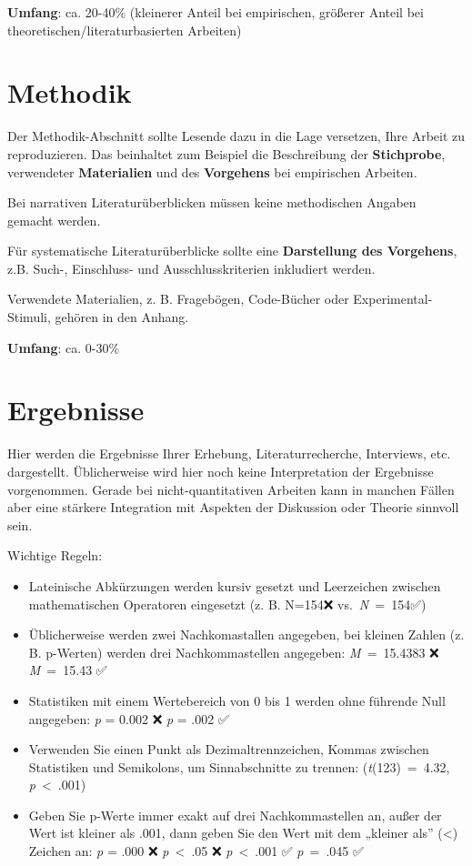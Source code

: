 \documentclass[
  letterpaper,
  DIV=11]{scrreprt}
\begin{document}
\textbf{Umfang}: ca. 20-40\% (kleinerer Anteil bei empirischen, größerer
Anteil bei theoretischen/literaturbasierten Arbeiten)

\section{Methodik}\label{methodik}

Der Methodik-Abschnitt sollte Lesende dazu in die Lage versetzen, Ihre
Arbeit zu reproduzieren. Das beinhaltet zum Beispiel die Beschreibung
der \textbf{Stichprobe}, verwendeter \textbf{Materialien} und des
\textbf{Vorgehens} bei empirischen Arbeiten.

Bei narrativen Literaturüberblicken müssen keine methodischen Angaben
gemacht werden.

Für systematische Literaturüberblicke sollte eine \textbf{Darstellung
des Vorgehens}, z.B. Such-, Einschluss- und Ausschlusskriterien
inkludiert werden.

Verwendete Materialien, z. B. Fragebögen, Code-Bücher oder
Experimental-Stimuli, gehören in den Anhang.

\textbf{Umfang}: ca. 0-30\%

\section{Ergebnisse}\label{ergebnisse}

Hier werden die Ergebnisse Ihrer Erhebung, Literaturrecherche,
Interviews, etc. dargestellt. Üblicherweise wird hier noch keine
Interpretation der Ergebnisse vorgenommen. Gerade bei
nicht-quantitativen Arbeiten kann in manchen Fällen aber eine stärkere
Integration mit Aspekten der Diskussion oder Theorie sinnvoll sein.

Wichtige Regeln:

\begin{itemize}
\item
  Lateinische Abkürzungen werden kursiv gesetzt und Leerzeichen zwischen
  mathematischen Operatoren eingesetzt (z. B. N=154❌
  vs.~\emph{N}~=~154✅)
\item
  Üblicherweise werden zwei Nachkomastallen angegeben, bei kleinen
  Zahlen (z. B. p-Werten) werden drei Nachkommastellen angegeben:
  \emph{M}~=~15.4383 ❌ \emph{M}~=~15.43 ✅
\item
  Statistiken mit einem Wertebereich von 0 bis 1 werden ohne führende
  Null angegeben: \emph{p} = 0.002 ❌ \emph{p} = .002 ✅
\item
  Verwenden Sie einen Punkt als Dezimaltrennzeichen, Kommas zwischen
  Statistiken und Semikolons, um Sinnabschnitte zu trennen:
  (\emph{t}(123)~=~4.32, \emph{p}~\textless~.001)
\item
  Geben Sie p-Werte immer exakt auf drei Nachkommastellen an, außer der
  Wert ist kleiner als .001, dann geben Sie den Wert mit dem „kleiner
  als'' (\textless) Zeichen an: \emph{p} = .000 ❌
  \emph{p}~\textless~.05 ❌ \emph{p}~\textless~.001 ✅ \emph{p}~=~.045
  ✅
\end{itemize}
\end{document}
